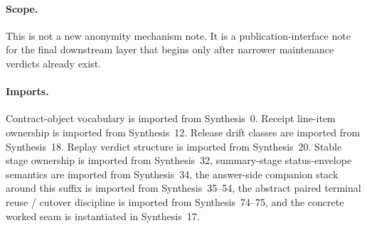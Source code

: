 \documentclass[11pt]{article}
\begin{document}
\paragraph{Scope.}
This is not a new anonymity mechanism note.
It is a publication-interface note for the final downstream layer that begins only after narrower maintenance verdicts already exist.

\paragraph{Imports.}
Contract-object vocabulary is imported from Synthesis~0.\cite{series:contractobjects}
Receipt line-item ownership is imported from Synthesis~12.\cite{series:receiptitems}
Release drift classes are imported from Synthesis~18.\cite{series:planstateequiv}
Replay verdict structure is imported from Synthesis~20.\cite{series:auditorreplay}
Stable stage ownership is imported from Synthesis~32, summary-stage status-envelope semantics are imported from Synthesis~34, the answer-side companion stack around this suffix is imported from Synthesis~35--54, the abstract paired terminal reuse / cutover discipline is imported from Synthesis~74--75, and the concrete worked seam is instantiated in Synthesis~17.\cite{series:releasespine,series:statusenvelopes,series:sentencelocks,series:challengeroutes,series:challengestops,series:challengebranches,series:challengecoverage,series:challengesurfacehooks,series:challengeterminalwitnesses,series:challengecoveragewitnesspacks,series:challengecoveragewitnessslices,series:challengecoveragewitnesscores,series:challengeanswercapsules,series:challengeanswersheets,series:challengeanswercards,series:challengeanswercarrierslots,series:challengeansweraudittrails,series:challengeanswercitationdockets,series:challengeanswerpublicationprofiles,series:challengeanswerdisclosurepackets,series:challengeanswerescalationladders,series:challengeanswerreviewmenus,series:pairedterminalcitationdiscipline,series:pairedterminalcutoverrules,series:workedexample}
\end{document}
